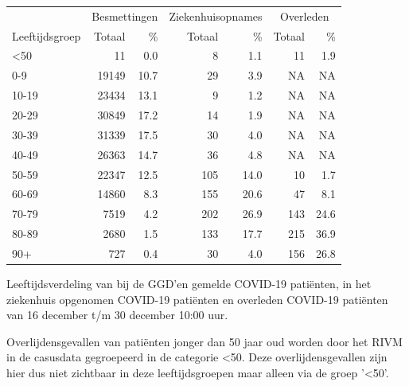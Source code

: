 \documentclass[
  english,
  man,floatsintext]{apa6}
\begin{document}
\begin{table}
\centering\begingroup\fontsize{11}{13}\selectfont

\begin{threeparttable}
\begin{tabular}{lrrrrrr}
\toprule
\multicolumn{1}{c}{ } & \multicolumn{2}{c}{Besmettingen} & \multicolumn{2}{c}{Ziekenhuisopnames} & \multicolumn{2}{c}{Overleden} \\
\cmidrule(l{3pt}r{3pt}){2-3} \cmidrule(l{3pt}r{3pt}){4-5} \cmidrule(l{3pt}r{3pt}){6-7}
Leeftijdsgroep & Totaal & \% & Totaal & \% & Totaal & \%\\
\midrule
<50 & 11 & 0.0 & 8 & 1.1 & 11 & 1.9\\
0-9 & 19149 & 10.7 & 29 & 3.9 & NA & NA\\
10-19 & 23434 & 13.1 & 9 & 1.2 & NA & NA\\
20-29 & 30849 & 17.2 & 14 & 1.9 & NA & NA\\
30-39 & 31339 & 17.5 & 30 & 4.0 & NA & NA\\
40-49 & 26363 & 14.7 & 36 & 4.8 & NA & NA\\
50-59 & 22347 & 12.5 & 105 & 14.0 & 10 & 1.7\\
60-69 & 14860 & 8.3 & 155 & 20.6 & 47 & 8.1\\
70-79 & 7519 & 4.2 & 202 & 26.9 & 143 & 24.6\\
80-89 & 2680 & 1.5 & 133 & 17.7 & 215 & 36.9\\
90+ & 727 & 0.4 & 30 & 4.0 & 156 & 26.8\\
\bottomrule
\end{tabular}
\begin{tablenotes}
\item[1] Leeftijdsverdeling van bij de GGD’en gemelde COVID-19 patiënten, in het ziekenhuis opgenomen COVID-19 patiënten en overleden COVID-19 patiënten van 16 december t/m 30 december 10:00 uur.
\item[2] Overlijdensgevallen van patiënten jonger dan 50 jaar oud worden door het RIVM in de casusdata gegroepeerd in de categorie <50. Deze overlijdensgevallen zijn hier dus niet zichtbaar in deze leeftijdsgroepen maar alleen via de groep '<50'.
\end{tablenotes}
\end{threeparttable}
\endgroup{}
\end{table}

\newpage
\end{document}
